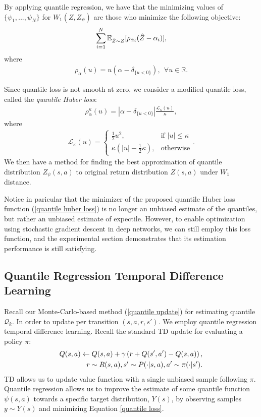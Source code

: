By applying quantile regression, we have that the minimizing values of $\{\psi_1,...,\psi_N\}$ for $W_1(Z,Z_{\psi})$ are those who minimize the following objective:
\begin{align}
    \notag
    \sum_{i=1}^N\mathbb{E}_{\hat{Z}\sim Z}[\rho_{\hat{\alpha}_i}(\hat{Z}-\alpha_i)],
\end{align}
where
\begin{align}\label{quantile loss}
    \rho_{\alpha}(u)=u(\alpha-\delta_{\{u<0\}}), ~~\forall u\in \mathbb{R.}
\end{align}

Since quantile loss is not smooth at zero, we consider a modified quantile loss, called the \textit{quantile Huber loss}:
\begin{align} \label{quantile huber loss}
    \rho_{\alpha}^{\kappa}(u)=|\alpha-\delta_{\{u<0\}}|\frac{\mathcal{L}_{\kappa}(u)}{\kappa},
\end{align}
where
\begin{align}
\mathcal{L}_\kappa(u) = 
    \begin{cases}
        \frac{1}{2}u^2, & \text{if } |u| \leq \kappa \\
        \kappa(|u| - \frac{1}{2}\kappa), & \text{otherwise}
    \end{cases}.
\end{align}
We then have a method for finding the best approximation of quantile distribution $Z_{\psi}(s,a)$ to original return distribution $Z(s,a)$ under $W_1$ distance.

Notice in paricular that the minimizer of the proposed quantile Huber loss function (\ref{quantile huber loss}) is no longer an unbiased estimate of the quantiles, but rather an unbiased estimate of expectile. However, to enable optimization using stochastic gradient descent in deep networks, we can still employ this loss function, and the experimental section demonstrates that its estimation performance is still satisfying.

\subsection{Quantile Regression Temporal Difference Learning}
Recall our Monte-Carlo-based method (\ref{quantile update}) for estimating quantile $\mathcal{Q}_k$. In order to update per transition $(s,a,r,s')$. We employ quantile regression temporal difference learning. Recall the standard TD update for evaluating a policy $\pi$:
\begin{align}
    \notag
    Q(s,a) \gets Q(s,a) + \gamma\left(r+Q(s',a')-Q(s,a)\right), \\
    r\sim R(s,a), s'\sim P(\cdot|s,a), a'\sim \pi(\cdot|s'). \notag
\end{align}
TD allows us to update value function with a single unbiased sample following $\pi$. Quantile regression allows us to improve the estimate of some quantile function $\psi(s,a)$ towards a specific target distribution, $Y(s)$, by observing samples $y\sim Y(s)$ and minimizing Equation \ref{quantile loss}.

